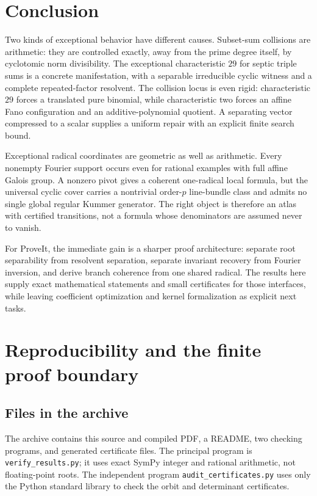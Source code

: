 \documentclass[11pt,a4paper]{article}
\theoremstyle{definition}
\theoremstyle{remark}
\newcommand{\code}[1]{{\small\nolinkurl{#1}}}
\begin{document}
\section{Conclusion}

Two kinds of exceptional behavior have different causes. Subset-sum
collisions are arithmetic: they are controlled exactly, away from the
prime degree itself, by cyclotomic norm divisibility. The exceptional
characteristic $29$ for septic triple sums is a concrete manifestation,
with a separable irreducible cyclic witness and a complete repeated-factor
resolvent. The collision locus is even rigid: characteristic $29$ forces
a translated pure binomial, while characteristic two forces an affine
Fano configuration and an additive-polynomial quotient. A separating
vector compressed to a scalar supplies a uniform
repair with an explicit finite search bound.

Exceptional radical coordinates are geometric as well as arithmetic.
Every nonempty Fourier support occurs even for rational examples with full
affine Galois group. A nonzero pivot gives a coherent one-radical local
formula, but the universal cyclic cover carries a nontrivial order-$p$
line-bundle class and admits no single global regular Kummer generator.
The right object is therefore an atlas with certified transitions, not a
formula whose denominators are assumed never to vanish.

For ProveIt, the immediate gain is a sharper proof architecture: separate
root separability from resolvent separation, separate invariant recovery
from Fourier inversion, and derive branch coherence from one shared
radical. The results here supply exact mathematical statements and small
certificates for those interfaces, while leaving coefficient optimization
and kernel formalization as explicit next tasks.

\appendix
\section{Reproducibility and the finite proof boundary}
\label{app:repro}

\subsection{Files in the archive}

The archive contains this source and compiled PDF, a README, two checking
programs, and generated certificate files. The principal program is
\code{verify_results.py}; it uses exact SymPy integer and rational
arithmetic, not floating-point roots. The independent program
\code{audit_certificates.py} uses only the Python standard library to check
the orbit and determinant certificates.
\end{document}
